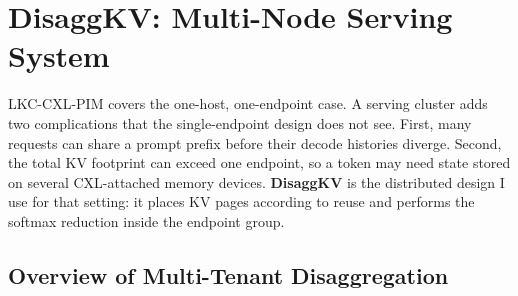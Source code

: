 \chapter{DisaggKV: Multi-Node Serving System}
\label{ch:disaggkv_system}

LKC-CXL-PIM covers the one-host, one-endpoint case. A serving cluster adds two complications that the single-endpoint design does not see. First, many requests can share a prompt prefix before their decode histories diverge. Second, the total KV footprint can exceed one endpoint, so a token may need state stored on several CXL-attached memory devices. \textbf{DisaggKV} is the distributed design I use for that setting: it places KV pages according to reuse and performs the softmax reduction inside the endpoint group.

\section{Overview of Multi-Tenant Disaggregation}


